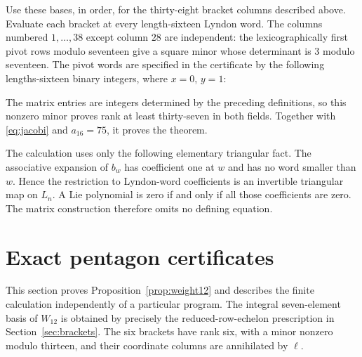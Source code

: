 \documentclass[11pt]{article}
\theoremstyle{definition}
\theoremstyle{remark}
\begin{document}
Use these bases, in order, for the thirty-eight bracket columns described
above.  Evaluate each bracket at every length-sixteen Lyndon word.  The
columns numbered $1,\ldots,38$ except column $28$ are independent: the
lexicographically first pivot rows modulo seventeen give a square minor
whose determinant is $3$ modulo seventeen.  The pivot words are specified
in the certificate by the following lengths-sixteen binary integers,
where $x=0$, $y=1$:
\begin{center}
\begin{minipage}{0.93\linewidth}\small\ttfamily\raggedright

\end{minipage}
\end{center}
The matrix entries are integers determined by the preceding definitions,
so this nonzero minor proves rank at least thirty-seven in both fields.
Together with \eqref{eq:jacobi} and $a_{16}=75$, it proves the theorem.

The calculation uses only the following elementary triangular fact.
The associative expansion of $b_w$ has coefficient one at $w$ and has no
word smaller than $w$.  Hence the restriction to Lyndon-word coefficients
is an invertible triangular map on $L_n$.  A Lie polynomial is zero if
and only if all those coefficients are zero.  The matrix construction
therefore omits no defining equation.

\section{Exact pentagon certificates}\label{sec:cert}
This section proves Proposition~\ref{prop:weight12} and describes the
finite calculation independently of a particular program.
The integral seven-element basis of $W_{12}$ is obtained by precisely the
reduced-row-echelon prescription in Section~\ref{sec:brackets}.  The six
brackets have rank six, with a minor nonzero modulo thirteen, and their
coordinate columns are annihilated by $\ell$.
\end{document}
